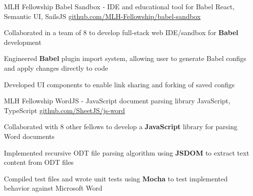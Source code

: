 \documentclass[]{awesome-cv}
\begin{document}
\vspace{-5mm}
\begin{cventries}
  \vspace{-1mm}
	\cventry
  {MLH Fellowship}
  {Babel Sandbox - IDE and educational tool for Babel}
  {React, Semantic UI, SailsJS}
  {\href{https://github.com/MLH-Fellowship/babel-sandbox}{github.com/MLH-Fellowship/babel-sandbox}}
  {\begin{cvitems}
    \item{Collaborated in a team of 8 to develop full-stack web IDE/sandbox for
      \textbf{Babel} development}
    \item{Engineered \textbf{Babel} plugin import system, allowing user to
      generate Babel configs and apply changes directly to code}
    \item{Developed UI components to enable link sharing and forking of saved
      configs}
    \end{cvitems}}

  \vspace{-3mm}
	\cventry
  {MLH Fellowship}
  {WordJS - JavaScript document parsing library}
  {JavaScript, TypeScript}
  {\href{https://github.com/SheetJS/js-word}{github.com/SheetJS/js-word}}
  {\begin{cvitems}
    \item {Collaborated with 8 other fellows to develop a \textbf{JavaScript} library
      for parsing Word documents}
    \item{Implemented recursive ODT file parsing algorithm using \textbf{JSDOM}
      to extract text content from ODT files}
    \item{Compiled test files and wrote unit tests using \textbf{Mocha} to test
      implemented behavior against Microsoft Word}
    \end{cvitems}}




\end{cventries}
\end{document}
